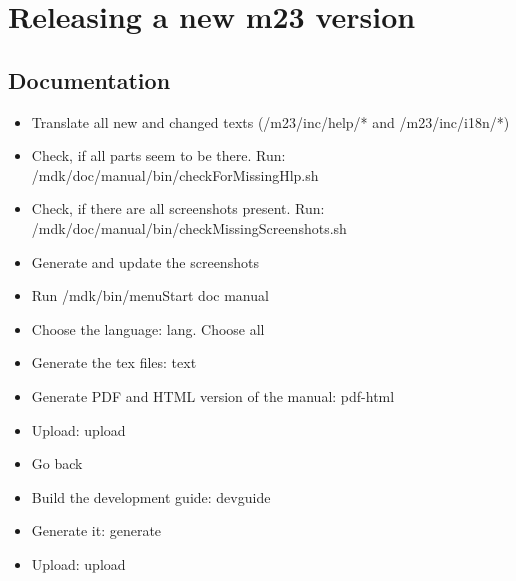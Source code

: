 \section{Releasing a new m23 version}

\subsection{Documentation}
\begin{itemize}
\item Translate all new and changed texts (/m23/inc/help/* and /m23/inc/i18n/*)
\item Check, if all parts seem to be there. Run: /mdk/doc/manual/bin/checkForMissingHlp.sh
\item Check, if there are all screenshots present. Run: /mdk/doc/manual/bin/checkMissingScreenshots.sh
\item Generate and update the screenshots
\item Run /mdk/bin/menuStart \Rightarrow doc \Rightarrow manual
\item Choose the language: \Rightarrow lang. Choose all
\item Generate the tex files: \Rightarrow text
\item Generate PDF and HTML version of the manual: \Rightarrow pdf-html
\item Upload: \Rightarrow upload
\item Go back
\item Build the development guide: \Rightarrow devguide
\item Generate it: \Rightarrow generate
\item Upload: \Rightarrow upload
\end{itemize}



